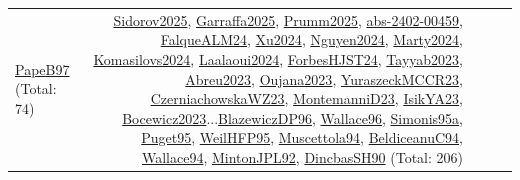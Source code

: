 {\begin{longtable}{p{3cm}r>{\raggedright\arraybackslash}p{6cm}>{\raggedright\arraybackslash}p{6cm}>{\raggedright\arraybackslash}p{8cm}}
\hyperref[detail:PapeB97]{PapeB97} (Total: 74) & \hyperref[detail:Sidorov2025]{Sidorov2025}, \hyperref[detail:Garraffa2025]{Garraffa2025}, \hyperref[detail:Prumm2025]{Prumm2025}, \hyperref[detail:abs-2402-00459]{abs-2402-00459}, \hyperref[detail:FalqueALM24]{FalqueALM24}, \hyperref[detail:Xu2024]{Xu2024}, \hyperref[detail:Nguyen2024]{Nguyen2024}, \hyperref[detail:Marty2024]{Marty2024}, \hyperref[detail:Komasilovs2024]{Komasilovs2024}, \hyperref[detail:Laalaoui2024]{Laalaoui2024}, \hyperref[detail:ForbesHJST24]{ForbesHJST24}, \hyperref[detail:Tayyab2023]{Tayyab2023}, \hyperref[detail:Abreu2023]{Abreu2023}, \hyperref[detail:Oujana2023]{Oujana2023}, \hyperref[detail:YuraszeckMCCR23]{YuraszeckMCCR23}, \hyperref[detail:CzerniachowskaWZ23]{CzerniachowskaWZ23}, \hyperref[detail:MontemanniD23]{MontemanniD23}, \hyperref[detail:IsikYA23]{IsikYA23}, \hyperref[detail:Bocewicz2023]{Bocewicz2023}...\hyperref[detail:BlazewiczDP96]{BlazewiczDP96}, \hyperref[detail:Wallace96]{Wallace96}, \hyperref[detail:Simonis95a]{Simonis95a}, \hyperref[detail:Puget95]{Puget95}, \hyperref[detail:WeilHFP95]{WeilHFP95}, \hyperref[detail:Muscettola94]{Muscettola94}, \hyperref[detail:BeldiceanuC94]{BeldiceanuC94}, \hyperref[detail:Wallace94]{Wallace94}, \hyperref[detail:MintonJPL92]{MintonJPL92}, \hyperref[detail:DincbasSH90]{DincbasSH90} (Total: 206)\\

\end{longtable}}
